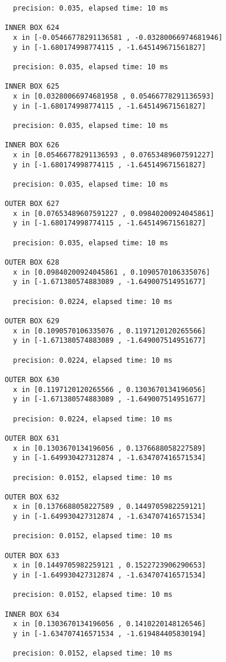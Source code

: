 \begin{verbatim}
  precision: 0.035, elapsed time: 10 ms

INNER BOX 624
  x in [-0.05466778291136581 , -0.03280066974681946]
  y in [-1.680174998774115 , -1.645149671561827]

  precision: 0.035, elapsed time: 10 ms

INNER BOX 625
  x in [0.03280066974681958 , 0.05466778291136593]
  y in [-1.680174998774115 , -1.645149671561827]

  precision: 0.035, elapsed time: 10 ms

INNER BOX 626
  x in [0.05466778291136593 , 0.07653489607591227]
  y in [-1.680174998774115 , -1.645149671561827]

  precision: 0.035, elapsed time: 10 ms

OUTER BOX 627
  x in [0.07653489607591227 , 0.09840200924045861]
  y in [-1.680174998774115 , -1.645149671561827]

  precision: 0.035, elapsed time: 10 ms

OUTER BOX 628
  x in [0.09840200924045861 , 0.1090570106335076]
  y in [-1.671380574883089 , -1.649007514951677]

  precision: 0.0224, elapsed time: 10 ms

OUTER BOX 629
  x in [0.1090570106335076 , 0.1197120120265566]
  y in [-1.671380574883089 , -1.649007514951677]

  precision: 0.0224, elapsed time: 10 ms

OUTER BOX 630
  x in [0.1197120120265566 , 0.1303670134196056]
  y in [-1.671380574883089 , -1.649007514951677]

  precision: 0.0224, elapsed time: 10 ms

OUTER BOX 631
  x in [0.1303670134196056 , 0.1376688058227589]
  y in [-1.649930427312874 , -1.634707416571534]

  precision: 0.0152, elapsed time: 10 ms

OUTER BOX 632
  x in [0.1376688058227589 , 0.1449705982259121]
  y in [-1.649930427312874 , -1.634707416571534]

  precision: 0.0152, elapsed time: 10 ms

OUTER BOX 633
  x in [0.1449705982259121 , 0.1522723906290653]
  y in [-1.649930427312874 , -1.634707416571534]

  precision: 0.0152, elapsed time: 10 ms

INNER BOX 634
  x in [0.1303670134196056 , 0.1410220148126546]
  y in [-1.634707416571534 , -1.619484405830194]

  precision: 0.0152, elapsed time: 10 ms


\end{verbatim}
